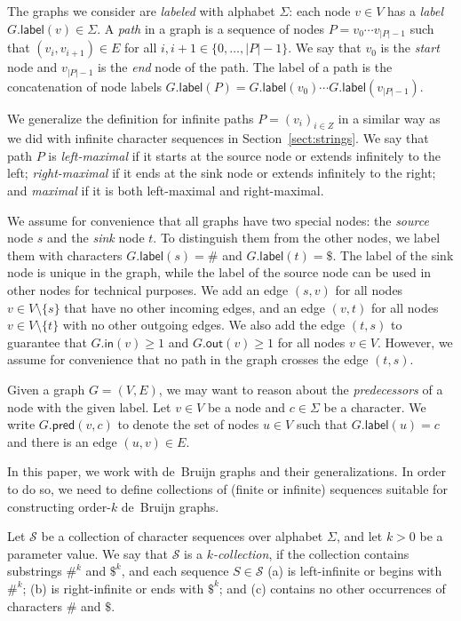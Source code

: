 \documentclass[a4paper,UKenglish]{lipics-v2016}
\newcommand{\set}[1]{\ensuremath{\{ #1 \}}}
\newcommand{\abs}[1]{\ensuremath{\lvert #1 \rvert}}
\newcommand{\gindegree}{\ensuremath{\mathsf{in}}}
\newcommand{\goutdegree}{\ensuremath{\mathsf{out}}}
\newcommand{\glabel}{\ensuremath{\mathsf{label}}}
\newcommand{\gpred}{\ensuremath{\mathsf{pred}}}
\newcommand{\kcollection}[1]{$#1$\nobreakdash-collection}
\newcommand{\orderk}[1]{order\nobreakdash-$#1$}
\begin{document}
The graphs we consider are \emph{labeled} with alphabet $\Sigma$: each node $v \in V$ has a \emph{label} $G.\glabel(v) \in \Sigma$. A \emph{path} in a graph is a sequence of nodes $P = v_{0} \dotsm v_{\abs{P}-1}$ such that $(v_{i}, v_{i+1}) \in E$ for all $i, i+1 \in \set{0, \dotsc, \abs{P}-1}$. We say that $v_{0}$ is the \emph{start} node and $v_{\abs{P}-1}$ is the \emph{end} node of the path. The label of a path is the concatenation of node labels $G.\glabel(P) = G.\glabel(v_{0}) \dotsm G.\glabel(v_{\abs{P}-1})$.

We generalize the definition for infinite paths $P = (v_{i})_{i \in Z}$ in a similar way as we did with infinite character sequences in Section~\ref{sect:strings}. We say that path $P$ is \emph{left-maximal} if it starts at the source node or extends infinitely to the left; \emph{right-maximal} if it ends at the sink node or extends infinitely to the right; and \emph{maximal} if it is both left-maximal and right-maximal.

We assume for convenience that all graphs have two special nodes: the \emph{source} node $s$ and the \emph{sink} node $t$. To distinguish them from the other nodes, we label them with characters $G.\glabel(s) = \#$ and $G.\glabel(t) = \$$. The label of the sink node is unique in the graph, while the label of the source node can be used in other nodes for technical purposes. We add an edge $(s, v)$ for all nodes $v \in V \setminus \set{s}$ that have no other incoming edges, and an edge $(v, t)$ for all nodes $v \in V \setminus \set{t}$ with no other outgoing edges. We also add the edge $(t, s)$ to guarantee that $G.\gindegree(v) \ge 1$ and $G.\goutdegree(v) \ge 1$ for all nodes $v \in V$. However, we assume for convenience that no path in the graph crosses the edge $(t, s)$.

Given a graph $G = (V, E)$, we may want to reason about the \emph{predecessors} of a node with the given label. Let $v \in V$ be a node and $c \in \Sigma$ be a character. We write $G.\gpred(v, c)$ to denote the set of nodes $u \in V$ such that $G.\glabel(u) = c$ and there is an edge $(u, v) \in E$.

In this paper, we work with de~Bruijn graphs and their generalizations. In order to do so, we need to define collections of (finite or infinite) sequences suitable for constructing \orderk{k} de~Bruijn graphs.

\begin{definition}[\kcollection{k}]
Let $\mathcal{S}$ be a collection of character sequences over alphabet $\Sigma$, and let $k > 0$ be a parameter value. We say that $\mathcal{S}$ is a \emph{\kcollection{k}}, if the collection contains substrings $\#^{k}$ and $\$^{k}$, and each sequence $S \in \mathcal{S}$
(a) is left-infinite or begins with $\#^{k}$;
(b) is right-infinite or ends with $\$^{k}$; and
(c) contains no other occurrences of characters $\#$ and $\$$.
\end{definition}
\end{document}
